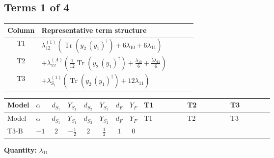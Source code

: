 \documentclass[8pt]{article}
\begin{document}
\begin{landscape}
\subsection*{Terms 1 of 4}
\begin{center}
\begin{tabular}{@{}c >{\raggedright\arraybackslash}p{0.82\linewidth}@{}}
\toprule
Column & Representative term structure \\
\midrule
T1 & \(\displaystyle {\lambda_{12}^{(1)}} (\operatorname{Tr}\!\left({y_2}\,\left({y_1}\right)^{\dagger}\right)+6 {\lambda_{10}}+6 {\lambda_{11}})\) \\
\midrule
T2 & \(\displaystyle +{\lambda_{12}^{(A)}} \left(\frac{1}{12} \operatorname{Tr}\!\left({y_2}\,\left({y_1}\right)^{\dagger}\right)+\frac{{\lambda_{10}}}{6}+\frac{5 {\lambda_{11}}}{6}\right)\) \\
\midrule
T3 & \(\displaystyle +{\lambda_{S_1}^{(1)}} (\operatorname{Tr}\!\left({y_2}\,\left({y_1}\right)^{\dagger}\right)+12 {\lambda_{11}})\) \\
\midrule
\bottomrule
\end{tabular}
\end{center}
\smallskip
\tiny
\begin{longtable}{@{}llcccccc >{\raggedright\arraybackslash}p{0.21\linewidth} >{\raggedright\arraybackslash}p{0.21\linewidth} >{\raggedright\arraybackslash}p{0.21\linewidth}@{}}
\toprule
Model & $\alpha$ & $d_{S_1}$ & $Y_{S_1}$ & $d_{S_2}$ & $Y_{S_2}$ & $d_F$ & $Y_F$ & T1 & T2 & T3 \\
\midrule
\endfirsthead
\toprule
Model & $\alpha$ & $d_{S_1}$ & $Y_{S_1}$ & $d_{S_2}$ & $Y_{S_2}$ & $d_F$ & $Y_F$ & T1 & T2 & T3 \\
\midrule
\endhead
T3-B & $-1$ & $2$ & $-\frac{1}{2}$ & $2$ & $\frac{1}{2}$ & $1$ & $0$ & \scriptsize\adjustbox{max width=\linewidth}{$\begin{gathered} {\lambda_{12}^{(1)}} (\operatorname{Tr}\!\left({y_2}\,\left({y_1}\right)^{\dagger}\right)+6 {\lambda_{10}}+6 {\lambda_{11}})\end{gathered}$} & \scriptsize\adjustbox{max width=\linewidth}{$\begin{gathered} +{\lambda_{12}^{(A)}} \left(\frac{1}{12} \operatorname{Tr}\!\left({y_2}\,\left({y_1}\right)^{\dagger}\right)+\frac{{\lambda_{10}}}{6}+\frac{5 {\lambda_{11}}}{6}\right)\end{gathered}$} & \scriptsize\adjustbox{max width=\linewidth}{$\begin{gathered} +{\lambda_{S_1}^{(1)}} (\operatorname{Tr}\!\left({y_2}\,\left({y_1}\right)^{\dagger}\right)+12 {\lambda_{11}})\end{gathered}$} \\
\midrule
\bottomrule
\end{longtable}
\clearpage
\noindent\textbf{Quantity: }$\lambda_{11}$\par\smallskip

\end{landscape}
\end{document}
